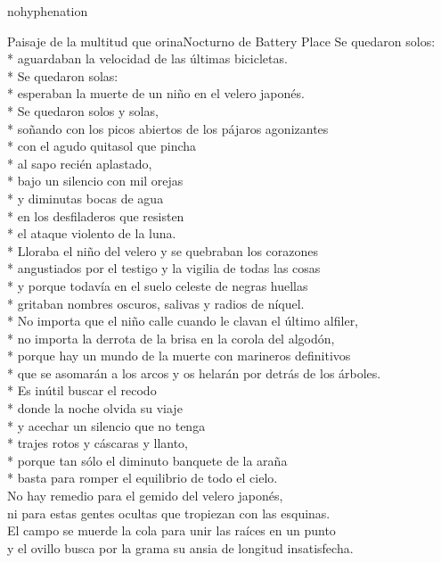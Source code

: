 \documentclass[
    a5paper,
    DIV=10,
    12pt,
    notitlepage,
    oneside,]
{scrbook} %
\begin{document}
\begin{hyphenrules}{nohyphenation}
\begin{poem}{Paisaje de la multitud que orina}{Nocturno de Battery Place}{}
Se quedaron solos:\\*
aguardaban la velocidad de las últimas bicicletas.\\*
Se quedaron solas:\\*
esperaban la muerte de un niño en el velero japonés.\\*
Se quedaron solos y solas,\\*
soñando con los picos abiertos de los pájaros agonizantes\\*
con el agudo quitasol que pincha\\*
al sapo recién aplastado,\\*
bajo un silencio con mil orejas\\*
y diminutas bocas de agua\\*
en los desfiladeros que resisten\\*
el ataque violento de la luna.\\*
Lloraba el niño del velero y se quebraban los corazones\\*
angustiados por el testigo y la vigilia de todas las cosas\\*
y porque todavía en el suelo celeste de negras huellas\\*
gritaban nombres oscuros, salivas y radios de níquel.\\*
No importa que el niño calle cuando le clavan el último alfiler,\\*
no importa la derrota de la brisa en la corola del algodón,\\*
porque hay un mundo de la muerte con marineros definitivos\\*
que se asomarán a los arcos y os helarán por detrás de los árboles.\\*
Es inútil buscar el recodo\\*
donde la noche olvida su viaje\\*
y acechar un silencio que no tenga\\*
trajes rotos y cáscaras y llanto,\\*
porque tan sólo el diminuto banquete de la araña\\*
basta para romper el equilibrio de todo el cielo.\\
No hay remedio para el gemido del velero japonés,\\
ni para estas gentes ocultas que tropiezan con las esquinas.\\
El campo se muerde la cola para unir las raíces en un punto\\
y el ovillo busca por la grama su ansia de longitud insatisfecha.\\

\end{poem}
\end{hyphenrules}
\end{document}
